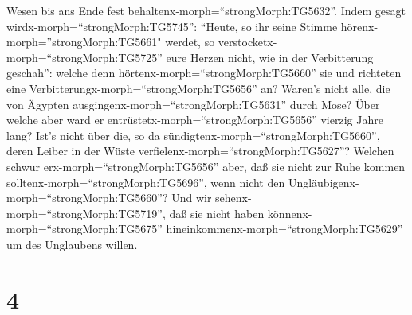 Wesen bis ans Ende fest behaltenx-morph=``strongMorph:TG5632''.
 Indem gesagt wirdx-morph=``strongMorph:TG5745'': ``Heute,
so ihr seine Stimme hörenx-morph=''strongMorph:TG5661" werdet, so
verstocketx-morph=``strongMorph:TG5725'' eure Herzen nicht, wie in der
Verbitterung geschah'':  welche denn
hörtenx-morph=``strongMorph:TG5660'' sie und richteten eine
Verbitterungx-morph=``strongMorph:TG5656'' an? Waren's nicht alle, die
von Ägypten ausgingenx-morph=``strongMorph:TG5631'' durch Mose?
 Über welche aber ward er
entrüstetx-morph=``strongMorph:TG5656'' vierzig Jahre lang? Ist's nicht
über die, so da sündigtenx-morph=``strongMorph:TG5660'', deren Leiber in
der Wüste verfielenx-morph=``strongMorph:TG5627''?  Welchen
schwur erx-morph=``strongMorph:TG5656'' aber, daß sie nicht zur Ruhe
kommen solltenx-morph=``strongMorph:TG5696'', wenn nicht den
Ungläubigenx-morph=``strongMorph:TG5660''?  Und wir
sehenx-morph=``strongMorph:TG5719'', daß sie nicht haben
könnenx-morph=``strongMorph:TG5675''
hineinkommenx-morph=``strongMorph:TG5629'' um des Unglaubens willen.

\hypertarget{section-3}{%
\section{4}\label{section-3}}

